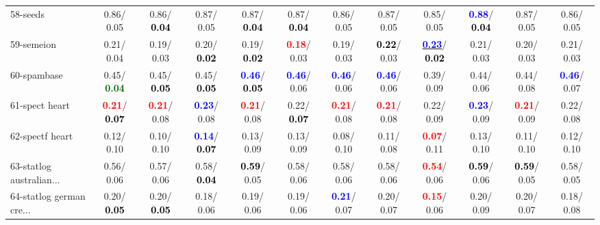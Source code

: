\begin{table}[h]
\begin{center}
{\begin{tabular}{lc|c|c|c|c|c|c|c|c|c|c}
58-seeds &   0.86/  0.05 &   0.86/\textcolor{black}{\textbf{  0.04}} &   0.87/  0.05 &   0.87/\textcolor{black}{\textbf{  0.04}} &   0.87/\textcolor{black}{\textbf{  0.04}} &   0.86/  0.05 &   0.87/  0.05 &   0.85/  0.05 & \textcolor{blue}{\textbf{  0.88}}/\textcolor{black}{\textbf{  0.04}} &   0.87/  0.05 &   0.86/  0.05 \\
59-semeion &   0.21/  0.04 &   0.19/  0.03 &   0.20/\textcolor{black}{\textbf{  0.02}} &   0.19/\textcolor{black}{\textbf{  0.02}} & \textcolor{red}{\textbf{  0.18}}/  0.03 &   0.19/  0.03 & \textcolor{black}{\textbf{  0.22}}/  0.03 & \underline{\textcolor{blue}{\textbf{  0.23}}}/\textcolor{black}{\textbf{  0.02}} &   0.21/  0.03 &   0.20/  0.03 &   0.21/  0.03 \\
60-spambase &   0.45/\textcolor{darkgreen}{\textbf{  0.04}} &   0.45/\textcolor{black}{\textbf{  0.05}} &   0.45/\textcolor{black}{\textbf{  0.05}} & \textcolor{blue}{\textbf{  0.46}}/\textcolor{black}{\textbf{  0.05}} & \textcolor{blue}{\textbf{  0.46}}/  0.06 & \textcolor{blue}{\textbf{  0.46}}/  0.06 & \textcolor{blue}{\textbf{  0.46}}/  0.06 &   0.39/  0.09 &   0.44/  0.06 &   0.44/  0.08 & \textcolor{blue}{\textbf{  0.46}}/  0.07 \\ \hline
61-spect heart & \textcolor{red}{\textbf{  0.21}}/\textcolor{black}{\textbf{  0.07}} & \textcolor{red}{\textbf{  0.21}}/  0.08 & \textcolor{blue}{\textbf{  0.23}}/  0.08 & \textcolor{red}{\textbf{  0.21}}/  0.08 &   0.22/\textcolor{black}{\textbf{  0.07}} & \textcolor{red}{\textbf{  0.21}}/  0.08 & \textcolor{red}{\textbf{  0.21}}/  0.08 &   0.22/  0.09 & \textcolor{blue}{\textbf{  0.23}}/  0.09 & \textcolor{red}{\textbf{  0.21}}/  0.09 &   0.22/  0.08 \\
62-spectf heart &   0.12/  0.10 &   0.10/  0.10 & \textcolor{blue}{\textbf{  0.14}}/\textcolor{black}{\textbf{  0.07}} &   0.13/  0.09 &   0.13/  0.09 &   0.08/  0.10 &   0.11/  0.08 & \textcolor{red}{\textbf{  0.07}}/  0.11 &   0.13/  0.10 &   0.11/  0.10 &   0.12/  0.10 \\
63-statlog australian... &   0.56/  0.06 &   0.57/  0.06 &   0.58/\textcolor{black}{\textbf{  0.04}} & \textcolor{black}{\textbf{  0.59}}/  0.05 &   0.58/  0.06 &   0.58/  0.06 &   0.58/  0.06 & \textcolor{red}{\textbf{  0.54}}/  0.06 & \textcolor{black}{\textbf{  0.59}}/  0.06 & \textcolor{black}{\textbf{  0.59}}/  0.05 &   0.58/  0.05 \\
64-statlog german cre... &   0.20/\textcolor{black}{\textbf{  0.05}} &   0.20/\textcolor{black}{\textbf{  0.05}} &   0.18/  0.06 &   0.19/  0.06 &   0.19/  0.06 & \textcolor{blue}{\textbf{  0.21}}/  0.07 &   0.20/  0.07 & \textcolor{red}{\textbf{  0.15}}/  0.06 &   0.20/  0.09 &   0.20/  0.07 &   0.18/  0.08 \\\end{tabular}}\label{stratsALCKappa1aELMRedux}
\end{center}
\end{table}
